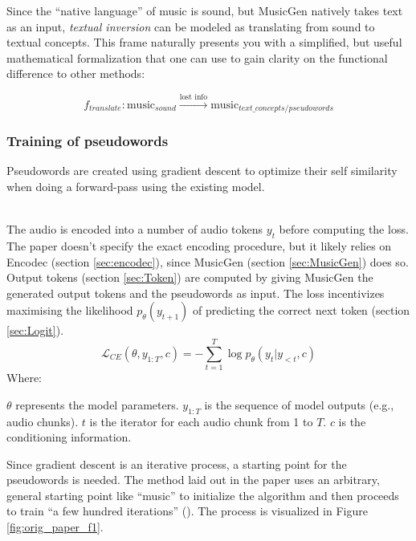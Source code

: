 \documentclass[a4paper,12pt,twoside]{article}
\begin{document}
Since the ``native language'' of music is sound, but MusicGen natively takes text as an input, \textit{textual inversion} can be modeled as translating from sound to textual concepts. This frame naturally presents you with a simplified, but useful mathematical formalization that one can use to gain clarity on the functional difference to other methods:

\begin{equation}\label{eq:translator_text_inv}
    f_{translate}: \text{music}_{sound} \xrightarrow{\text{lost info}} \text{music}_{text\_concepts/pseudowords}
\end{equation}

\subsubsection{Training of pseudowords}
Pseudowords are created using gradient descent to optimize their self similarity when doing a forward-pass using the existing model.\\ \

The audio is encoded into a number of audio tokens $y_t$ before computing the loss. The paper doesn't specify the exact encoding procedure, but it likely relies on Encodec (section \ref{sec:encodec}), since MusicGen (section \ref{sec:MusicGen}) does so.\\

Output tokens (section \ref{sec:Token}) are computed by giving MusicGen the generated output tokens and the pseudowords as input. The loss incentivizes maximising the likelihood $p_\theta(y_{t+1})$ of predicting the correct next token (section \ref{sec:Logit}).
\begin{equation}\label{eq:crossEntropyLoss}
    \mathcal{L}_{CE}(\theta, y_{1:T}, c) = - \sum_{t=1}^{T} \log p_{\theta}(y_t|y_{<t}, c)
\end{equation}
Where:

\begin{outline}
    \1 $\theta$ represents the model parameters.
    \1 $y_{1:T}$ is the sequence of model outputs (e.g., audio chunks).
    \1 $t$ is the iterator for each audio chunk from 1 to $T$.
    \1 $c$ is the conditioning information.
\end{outline}

Since gradient descent is an iterative process, a starting point for the pseudowords is needed. The method laid out in the paper uses an arbitrary, general starting point like ``music'' to initialize the algorithm and then proceeds to train ``a few hundred iterations'' (\cite{rouardAudioConditioningMusic2024}). The process is visualized in Figure \ref{fig:orig_paper_f1}.\\ \
\end{document}

